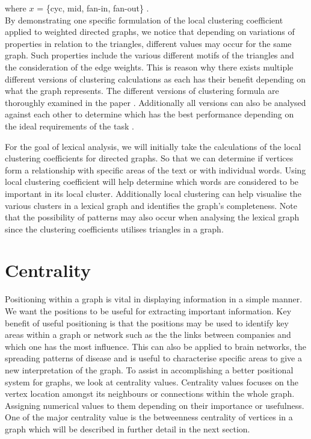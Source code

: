 where $x$ = \{cyc, mid, fan-in, fan-out\} .\\

By demonstrating one specific formulation of the local clustering coefficient applied to weighted directed graphs, we notice that depending on variations of properties in relation to the triangles, different values may occur for the same graph. Such properties include the various different motifs of the triangles and the consideration of the edge weights. This is reason why there exists multiple different versions of clustering calculations as each has their benefit depending on what the graph represents. The different versions of clustering formula are thoroughly examined in the paper \cite{PhysRevResearch.3.043124}. Additionally all versions can also be analysed against each other to determine which has the best performance depending on the ideal requirements of the task \cite{CLEMENTE201826}.

For the goal of lexical analysis, we will initially take the calculations of the local clustering coefficients for directed graphs. So that we can determine if vertices form a relationship with specific areas of the text or with individual words. Using local clustering coefficient will help determine which words are considered to be important in its local cluster. Additionally local clustering can help visualise the various clusters in a lexical graph and identifies the graph's completeness. Note that the possibility of patterns may also occur when analysing the lexical graph since the clustering coefficients utilises triangles in a graph. 

\section{Centrality}
Positioning within a graph is vital in displaying information in a simple manner. We want the positions to be useful for extracting important information. Key benefit of useful positioning is that the positions may be used to identify key areas within a graph or network such as the the links between companies and which one has the most influence. This can also be applied to brain networks, the spreading patterns of disease and is useful to characterise specific areas to give a new interpretation of the graph. To assist in accomplishing a better positional system for graphs, we look at centrality values. Centrality values focuses on the vertex location amongst its neighbours or connections within the whole graph. Assigning numerical values to them depending on their importance or usefulness. One of the major centrality value is the betweenness centrality of vertices in a graph which will be described in further detail in the next section.

